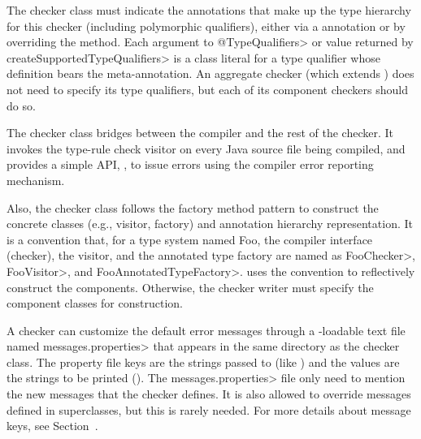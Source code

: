 The checker class must indicate the annotations
that make up the type hierarchy for this checker (including
polymorphic qualifiers), either via a
 annotation or by overriding
the
method.  Each argument to \<@TypeQualifiers> or value returned by
\<createSupportedTypeQualifiers> is a class literal for a type qualifier
whose definition bears the
 meta-annotation.
An aggregate checker (which extends
) does not need to specify its
type qualifiers, but each of its component checkers should do so.


The checker class bridges between the compiler and the rest of the checker.  It
invokes the type-rule check visitor on every Java source file being
compiled, and provides a simple API, , to issue
errors using the compiler error reporting mechanism.

Also, the checker class follows the factory method pattern to
construct the concrete classes (e.g., visitor, factory) and annotation
hierarchy representation.  It is a convention that, for
a type system named Foo, the compiler
interface (checker), the visitor, and the annotated type factory are
named as \<FooChecker>, \<FooVisitor>, and \<FooAnnotatedTypeFactory>.
 uses the convention to
reflectively construct the components.  Otherwise, the checker writer
must specify the component classes for construction.

\begin{sloppypar}
A checker can customize the default error messages through a
-loadable text file named
\<messages.properties> that appears in the same directory as the checker class.
The property file keys are the strings passed to 
(like ) and the values are the strings to be
printed ().
The \<messages.properties> file only need to mention the new messages that
the checker defines.
It is also allowed to override messages defined in superclasses, but this
is rarely needed.
For more details about message keys, see Section~.
\end{sloppypar}


